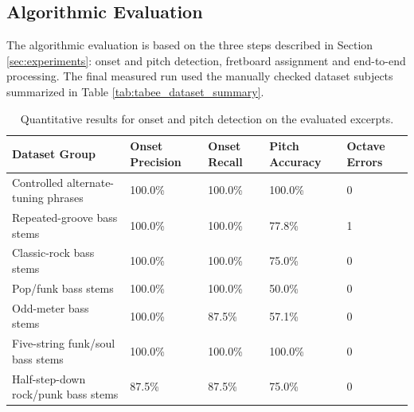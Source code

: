 \documentclass[a4paper, 12pt, titlepage]{article}
\begin{document}
\subsection{Algorithmic Evaluation}

The algorithmic evaluation is based on the three steps described in Section \ref{sec:experiments}: onset and pitch detection, fretboard assignment and end-to-end processing. The final measured run used the manually checked dataset subjects summarized in Table \ref{tab:tabee_dataset_summary}.

\begin{table}[H]
    \centering
    \begin{tabular}{|p{}|p{}|p{}|p{}|p{}|}
        \hline
        \textbf{Dataset Group} & \textbf{Onset Precision} & \textbf{Onset Recall} & \textbf{Pitch Accuracy} & \textbf{Octave Errors} \\
        \hline
        Controlled alternate-tuning phrases & 100.0\% & 100.0\% & 100.0\% & 0 \\
        \hline
        Repeated-groove bass stems & 100.0\% & 100.0\% & 77.8\% & 1 \\
        \hline
        Classic-rock bass stems & 100.0\% & 100.0\% & 75.0\% & 0 \\
        \hline
        Pop/funk bass stems & 100.0\% & 100.0\% & 50.0\% & 0 \\
        \hline
        Odd-meter bass stems & 100.0\% & 87.5\% & 57.1\% & 0 \\
        \hline
        Five-string funk/soul bass stems & 100.0\% & 100.0\% & 100.0\% & 0 \\
        \hline
        Half-step-down rock/punk bass stems & 87.5\% & 87.5\% & 75.0\% & 0 \\
        \hline
    \end{tabular}
    \caption{Quantitative results for onset and pitch detection on the evaluated excerpts.}
    \label{tab:tabee_onset_pitch_results}
\end{table}
\end{document}
